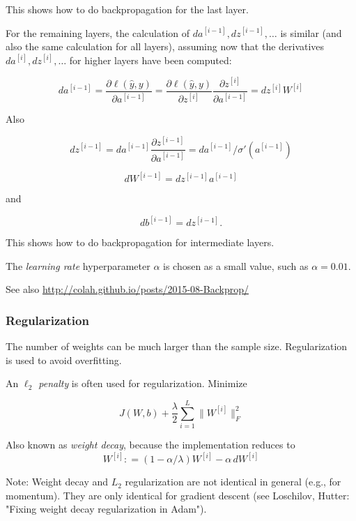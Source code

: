 \documentclass[english]{article}
\begin{document}
This shows how to do backpropagation for the last layer. 


\item 
For the remaining layers, the calculation of $da^{[i-1]}, dz^{[i-1]}, \ldots $ is similar (and also the same calculation for all layers), assuming now that the derivatives $da^{[i]}, dz^{[i]}, \ldots $  for higher layers have been computed: 

$$d a^{[i-1]} 
= \frac{\partial \ell(\hat y, y)}{\partial  a^{[i-1]}} 
= \frac{\partial \ell(\hat y, y)}{\partial  z^{[i]}} \frac{\partial  z^{[i]}} {\partial  a^{[i-1]}}
= dz^{[i]}W^{[i]}$$

Also

$$d z^{[i-1]} 
= d a^{[i-1]}\frac{\partial  z^{[i-1]}}{\partial  a^{[i-1]}} = d a^{[i-1]}/ \sigma' (a^{[i-1]})$$

$$d W^{[i-1]} 
= d z^{[i-1]} a^{[i-1]}$$

and

$$d b^{[i-1]} = d z^{[i-1]}.$$

This shows how to do backpropagation for intermediate layers. 
\eenum 
\item The \emph{learning rate} hyperparameter $\alpha$ is chosen as a small value, such as $\alpha = 0.01$. 

\item See also \url{http://colah.github.io/posts/2015-08-Backprop/}


\eenum 
\subsubsection{Regularization}

\benum
\item The number of weights can be much larger than the sample size. Regularization is used to avoid overfitting. 

\item 
An \emph{$\ell_2$ penalty} is often used for regularization. Minimize

$$J(W,b) + \frac{\lambda}{2} \sum_{i=1}^L \|W^{[i]} \|_F^2$$

Also known as \emph{weight decay}, because the implementation reduces to 
$$W^{[i]}: = (1-\alpha/\lambda) W^{[i]} - \alpha\, dW^{[i]}$$

Note: Weight decay and $L_2$ regularization are not identical in general (e.g., for momentum). They are only identical for gradient descent (see Loschilov, Hutter: "Fixing weight decay regularization in Adam"). 
\end{document}
